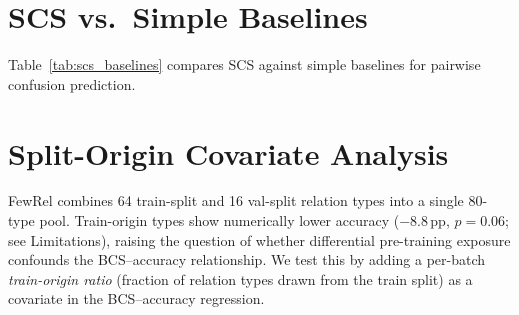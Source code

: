 \documentclass[11pt]{article}
\begin{document}
\section{SCS vs.\ Simple Baselines}
\label{app:scs-baselines}

Table~\ref{tab:scs_baselines} compares SCS against simple baselines for pairwise confusion prediction.

\begin{table}[h]
\centering
\small
\caption{Pairwise confusion prediction: SCS vs.\ simple baselines. Spearman $\rho$ between each metric and the empirical confusion rate. SCS outperforms all baselines on FewRel; the margin is smaller on Few-NERD, where hierarchical naming conventions provide partial signal to string-based metrics. $^\dagger$42\% of pairs lack WordNet coverage.}
\label{tab:scs_baselines}
\end{table}

\section{Split-Origin Covariate Analysis}
\label{app:split-origin}

FewRel combines 64 train-split and 16 val-split relation types into a single 80-type pool.  Train-origin types show numerically lower accuracy ($-8.8$\,pp, $p = 0.06$; see Limitations), raising the question of whether differential pre-training exposure confounds the BCS--accuracy relationship.  We test this by adding a per-batch \emph{train-origin ratio} (fraction of relation types drawn from the train split) as a covariate in the BCS--accuracy regression.
\end{document}
